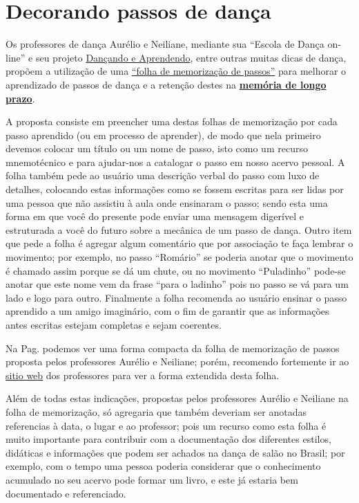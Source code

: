 
\section{Decorando passos de dança}
\label{sec:decorando-passos-de-danca}
Os professores de dança Aurélio e Neiliane,
mediante sua ``Escola de Dança on-line'' e seu projeto 
\href{https://www.facebook.com/dancandoeaprendendo/}{Dançando e Aprendendo}, 
entre outras muitas dicas de dança,
propõem
a utilização de uma \href{https://www.youtube.com/watch?v=ePwjQx5egAo}{``folha de memorização de passos''} 
para melhorar o aprendizado de passos de dança 
e a retenção destes na \hyperref[sec:memoria:longo]{\textbf{memória de longo prazo}}.

A proposta consiste em preencher uma destas folhas de memorização
por cada passo aprendido (ou em processo de aprender),
de modo que nela primeiro devemos colocar um título ou um nome de passo,
isto como um recurso mnemotécnico e para ajudar-nos a catalogar o passo em nosso acervo pessoal.
A folha também pede ao usuário uma descrição verbal do passo com luxo de detalhes, 
colocando estas informações como se fossem escritas para ser lidas por uma pessoa 
que não assistiu à aula onde ensinaram o passo; 
sendo esta uma forma em que você do presente pode enviar 
uma mensagem digerível e estruturada a você do futuro
sobre a mecânica de um passo de dança.
Outro item que pede a folha é agregar algum comentário que por associação 
te faça lembrar o movimento; por exemplo, no passo ``Romário'' se poderia anotar que 
o movimento é chamado assim porque se dá um chute, ou 
no movimento ``Puladinho'' pode-se anotar que este nome vem da frase ``para o ladinho'' pois no passo 
se vá para um lado e logo para outro.
Finalmente a folha recomenda ao usuário
ensinar o passo aprendido a um amigo imaginário,
com o fim de garantir que as informações antes escritas estejam completas 
e sejam coerentes.

\begin{tcbattention}
Na Pag. \pageref{pos:page:folhamemorizacao} 
podemos ver uma forma compacta da folha de memorização 
de passos proposta pelos professores Aurélio e Neiliane; porém,
recomendo fortemente ir ao 
\href{https://www.youtube.com/watch?v=ePwjQx5egAo}{sitio web}
dos professores para ver a forma extendida desta folha.
\end{tcbattention}

Além de todas estas indicações, 
propostas pelos professores Aurélio e Neiliane
na folha de memorização,
só agregaria que também deveriam ser anotadas referencias 
à data, o lugar e ao professor; pois um recurso como esta folha é muito importante
para contribuir com a documentação dos diferentes estilos, didáticas e informações
que podem ser achados na dança de salão no Brasil;
por exemplo, com o tempo uma pessoa poderia considerar que o conhecimento 
acumulado no seu acervo pode formar um livro, 
e este já estaria bem documentado e referenciado.

